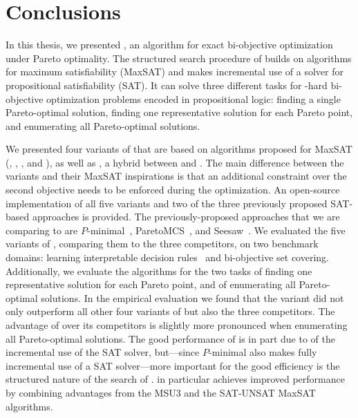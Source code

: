 \chapter{Conclusions\label{chap:conclusion}}

In this thesis, we presented \algname{}, an algorithm for exact bi-objective optimization under Pareto optimality.
The structured search procedure of \algname{} builds on algorithms for maximum satisfiability (MaxSAT) and makes incremental use of a solver for propositional satisfiability (SAT).
It can solve three different tasks for \NP-hard bi-objective optimization problems encoded in propositional logic:
finding a single Pareto-optimal solution, finding one representative solution for each Pareto point, and enumerating all Pareto-optimal solutions.

We presented four variants of \algname{} that are based on algorithms proposed for MaxSAT (\satunsat{}, \unsatsat{}, \msu{}, and \oll{}), as well as \msh{}, a hybrid between \msu{} and \satunsat{}.
The main difference between the \algname{} variants and their MaxSAT inspirations is that an additional constraint over the second objective needs to be enforced during the optimization.
An open-source implementation of all five variants and two of the three previously proposed SAT-based approaches is provided.
The previously-proposed approaches that we are comparing to are $P$-minimal~\autocite{DBLP:conf/cp/SohBTB17}, ParetoMCS~\autocite{DBLP:conf/ijcai/Terra-NevesLM18a}, and Seesaw~\autocite{DBLP:conf/cp/JanotaMSM21}.
We evaluated the five variants of \algname{}, comparing them to the three competitors, on two benchmark domains: learning interpretable decision rules~\autocite{DBLP:conf/cp/MaliotovM18} and bi-objective set covering.
Additionally, we evaluate the algorithms for the two tasks of finding one representative solution for each Pareto point, and of enumerating all Pareto-optimal solutions.
In the empirical evaluation we found that the \msh{} variant did not only outperform all other four variants of \algname{} but also the three competitors.
The advantage of \algname{} over its competitors is slightly more pronounced when enumerating all Pareto-optimal solutions.
The good performance of \algname{} is in part due to of the incremental use of the SAT solver, but---since $P$-minimal also makes fully incremental use of a SAT solver---more important for the good efficiency is the structured nature of the search of \algname{}.
\msh{} in particular achieves improved performance by combining advantages from the MSU3 and the SAT-UNSAT MaxSAT algorithms.


